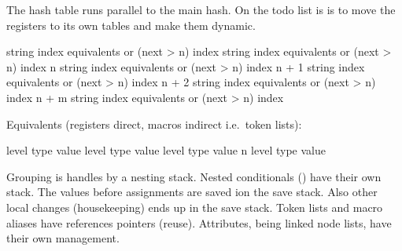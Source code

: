 \stoptable

\starttitle[title=The hash table (simplified)]

The hash table runs parallel to the main hash. On the todo list is is to move the
registers to its own tables and make them dynamic.

\startlinecorrection[blank]
    \setupTABLE[each][align=middle]
    \setupTABLE[c][1][width=16mm]
    \setupTABLE[c][2][width=64mm]
    \setupTABLE[c][3][width=64mm]
    \bTABLE
        \bTR {}     \eTD \bTD string index \eTD \bTD equivalents or (next > n) index \eTD \eTR
        \bTR {}     \eTD \bTD string index \eTD \bTD equivalents or (next > n) index \eTD \eTR
        \bTR \bTD n     \eTD \bTD string index \eTD \bTD equivalents or (next > n) index \eTD \eTR
        \bTR \bTD n + 1 \eTD \bTD string index \eTD \bTD equivalents or (next > n) index \eTD \eTR
        \bTR \bTD n + 2 \eTD \bTD string index \eTD \bTD equivalents or (next > n) index \eTD \eTR
        \bTR \bTD n + m \eTD \bTD string index \eTD \bTD equivalents or (next > n) index \eTD \eTR
    \eTABLE
\stoplinecorrection

Equivalents (registers direct, macros indirect i.e.\ token lists):

\startlinecorrection[blank]
    \setupTABLE[each][align=middle]
    \setupTABLE[c][1][width=8mm]
    \setupTABLE[c][2][width=32mm]
    \setupTABLE[c][3][width=32mm]
    \setupTABLE[c][4][width=64mm]
    \bTABLE
        \bTR {} \eTD \bTD level \eTD \bTD type \eTD \bTD value \eTD \eTR
        \bTR {} \eTD \bTD level \eTD \bTD type \eTD \bTD value \eTD \eTR
        \bTR {} \eTD \bTD level \eTD \bTD type \eTD \bTD value \eTD \eTR
        \bTR \bTD n \eTD \bTD level \eTD \bTD type \eTD \bTD value \eTD \eTR
    \eTABLE
\stoplinecorrection

\stoptitle

\starttitle[title=Other data management]

\startitemize
\startitem Grouping is handles by a nesting stack. \stopitem
\startitem Nested conditionals () have their own stack. \stopitem
\startitem The values before assignments are saved ion the save stack. \stopitem
\startitem Also other local changes (housekeeping) ends up in the save stack. \stopitem
\startitem Token lists and macro aliases have references pointers (reuse). \stopitem
\startitem Attributes, being linked node lists, have their own management. \stopitem
\stopitemize

\stoptitle

\starttitle[title=Example 1: in the input]

